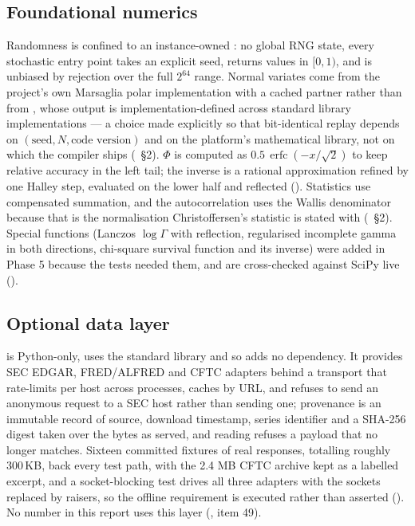 \documentclass[11pt,a4paper]{article}
\begin{document}
\subsection{Foundational numerics}
Randomness is confined to an instance-owned 
\citep{iso2020cpp,matsumoto1998mersenne}: no global RNG state, every stochastic entry point
takes an explicit seed,  returns values in $[0,1)$, and 
is unbiased by rejection over the full $2^{64}$ range. Normal variates come from the project's
own Marsaglia polar implementation with a cached partner rather than from
, whose output is implementation-defined across standard
library implementations --- a choice made explicitly so that bit-identical replay depends on
$(\text{seed}, N, \text{code version})$ and on the platform's mathematical library, not on
which  the compiler ships
(~\S2).
$\Phi$ is computed as $0.5\,\operatorname{erfc}(-x/\sqrt2)$ to keep relative accuracy in the
left tail; the inverse is a rational approximation refined by one Halley step, evaluated on the
lower half and reflected ().
Statistics use compensated summation, and the autocorrelation uses the Wallis denominator
because that is the normalisation Christoffersen's statistic is stated with
(~\S2). Special functions
(Lanczos $\log\Gamma$ with reflection, regularised incomplete gamma in both directions,
chi-square survival function and its inverse) were added in Phase 5 because the tests needed
them, and are cross-checked against SciPy live ().

\subsection{Optional data layer}
 is Python-only, uses the standard library and so adds no dependency. It
provides SEC EDGAR, FRED/ALFRED and CFTC adapters behind a transport that rate-limits per host
across processes, caches by URL, and refuses to send an anonymous request to a SEC host rather
than sending one; provenance is an immutable record of source, download timestamp, series
identifier and a SHA-256 digest taken over the bytes as served, and reading refuses a payload
that no longer matches. Sixteen committed fixtures of real responses, totalling roughly 300\,KB, back every test path,
with the 2.4 MB CFTC archive kept as a labelled excerpt, and a socket-blocking test drives all
three adapters with the sockets replaced by raisers, so the offline requirement is executed
rather than asserted (). No number in this
report uses this layer (, item 49).
\end{document}
